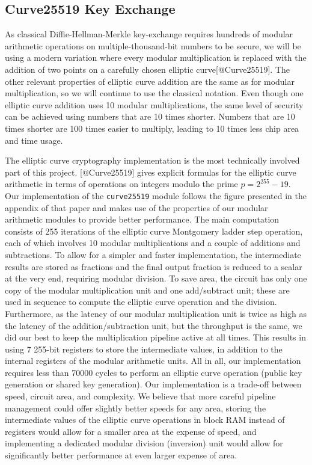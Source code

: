 \subsection{Curve25519 Key Exchange}\label{curve25519-key-exchange}

As classical Diffie-Hellman-Merkle key-exchange requires hundreds of
modular arithmetic operations on multiple-thousand-bit numbers to be
secure, we will be using a modern variation where every modular
multiplication is replaced with the addition of two points on a
carefully chosen elliptic curve{[}@Curve25519{]}. The other relevant
properties of elliptic curve addition are the same as for modular
multiplication, so we will continue to use the classical notation. Even
though one elliptic curve addition uses 10 modular multiplications, the
same level of security can be achieved using numbers that are 10 times
shorter. Numbers that are 10 times shorter are 100 times easier to
multiply, leading to 10 times less chip area and time usage.

The elliptic curve cryptography implementation is the most technically
involved part of this project. {[}@Curve25519{]} gives explicit formulas
for the elliptic curve arithmetic in terms of operations on integers
modulo the prime \(p=2^{255} - 19\). Our implementation of the
\texttt{curve25519} module follows the figure presented in the appendix
of that paper and makes use of the properties of our modular arithmetic
modules to provide better performance. The main computation consists of
255 iterations of the elliptic curve Montgomery ladder step operation,
each of which involves 10 modular multiplications and a couple of
additions and subtractions. To allow for a simpler and faster
implementation, the intermediate results are stored as fractions and the
final output fraction is reduced to a scalar at the very end, requiring
modular division. To save area, the circuit has only one copy of the
modular multiplication unit and one add/subtract unit; these are used in
sequence to compute the elliptic curve operation and the division.
Furthermore, as the latency of our modular multiplication unit is twice
as high as the latency of the addition/subtraction unit, but the
throughput is the same, we did our best to keep the multiplication
pipeline active at all times. This results in using 7 255-bit registers
to store the intermediate values, in addition to the internal registers
of the modular arithmetic units. All in all, our implementation requires
less than 70000 cycles to perform an elliptic curve operation (public
key generation or shared key generation). Our implementation is a
trade-off between speed, circuit area, and complexity. We believe that
more careful pipeline management could offer slightly better speeds for
any area, storing the intermediate values of the elliptic curve
operations in block RAM instead of registers would allow for a smaller
area at the expense of speed, and implementing a dedicated modular
division (inversion) unit would allow for significantly better
performance at even larger expense of area.

